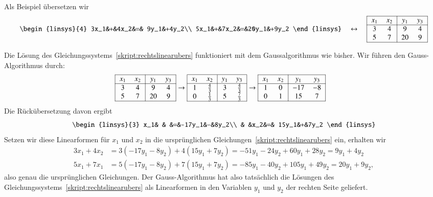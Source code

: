 \begin{beispiel}
\label{skript:lingl:simultan-beispiel}
Als Beispiel übersetzen wir
\begin{equation}
\begin{linsys}{4}
3x_1&+&4x_2&=& 9y_1&+4y_2\\
5x_1&+&7x_2&=&20y_1&+9y_2
\end{linsys}
\quad\leftrightarrow\quad
\begin{tabular}{| >{$}c<{$} >{$}c<{$}| >{$}c<{$} >{$}c<{$}|}
\hline
x_1&x_2&y_1&y_3\\
\hline
3&4&9&4\\
5&7&20&9\\
\hline
\end{tabular}
\label{skript:rechtslinearubers}
\end{equation}

Die Lösung des Gleichungssystems~\eqref{skript:rechtslinearubers} 
funktioniert mit dem Gaussalgorithmus wie bisher.
Wir führen den Gauss-Algorithmus durch:
\begin{align*}
\begin{tabular}{| >{$}c<{$} >{$}c<{$}| >{$}c<{$} >{$}c<{$}|}
\hline
x_1&x_2&y_1&y_3\\
\hline
3&4&9&4\\
5&7&20&9\\
\hline
\end{tabular}
&\rightarrow
\begin{tabular}{| >{$}c<{$} >{$}c<{$}| >{$}c<{$} >{$}c<{$}|}
\hline
x_1&x_2&y_1&y_3\\
\hline
1&\frac{4}{3}&3&\frac{4}{3}\\
0&\frac{1}{3}&5&\frac{7}{3}\\
\hline
\end{tabular}
\rightarrow
\begin{tabular}{| >{$}c<{$} >{$}c<{$}| >{$}c<{$} >{$}c<{$}|}
\hline
x_1&x_2&y_1&y_3\\
\hline
1&0&-17&-8\\
0&1& 15& 7\\
\hline
\end{tabular}
\end{align*}
Die Rückübersetzung davon ergibt
\[
\begin{linsys}{3}
x_1& &   &=&-17y_1&-&8y_2\\
   & &x_2&=& 15y_1&+&7y_2
\end{linsys}
\]
Setzen wir diese Linearformen für $x_1$ und $x_2$ in die ursprünglichen
Gleichungen~\eqref{skript:rechtslinearubers} ein, erhalten
wir
\begin{align*}
3x_1+4x_2
&=
3(-17y_1-8y_2)+4(15y_1+7y_2)
=
-51y_1-24y_2+60y_1+28y_2
=
9y_1+4y_2
\\
5x_1+7x_1
&=
5(-17y_1-8y_2)+7(15y_1+7y_2)
=
-85y_1-40y_2+105y_1+49y_2
=
20y_1+9y_2,
\end{align*}
also genau die ursprünglichen Gleichungen.
Der Gauss-Algorithmus hat also tatsächlich die Lösungen des
Gleichungssystems~\eqref{skript:rechtslinearubers} als
Linearformen in den Variablen $y_1$ und $y_2$ der rechten Seite
geliefert.
\end{beispiel}


